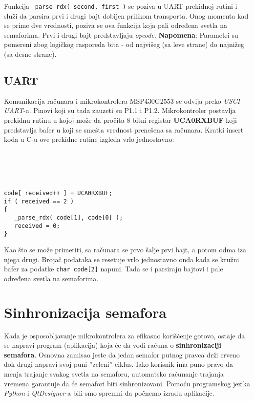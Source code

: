 \documentclass[a4paper,12pt, projekat]{etf}
\begin{document}
Funkcija \verb|_parse_rdx( second, first )| se poziva u UART prekidnoj rutini i služi da parsira prvi i drugi bajt dobijen prilikom transporta. Onog momenta kad se prime dve vrednosti, poziva se ova funkcija koja pali određena svetla na semaforima. Prvi i drugi bajt predstavljaju \textit{opcode}. \textbf{Napomena}: Parametri su pomereni zbog logičkog rasporeda bita - od najvišeg (sa leve strane) do najnižeg (sa desne strane).

\subsection{UART}
Komunikacija računara i mikrokontrolera MSP430G2553 se odvija preko \textit{USCI UART}-a. Pinovi koji su tada zauzeti su P1.1 i P1.2. Mikrokontroler postavlja prekidnu rutinu u kojoj može da pročita 8-bitni registar \textbf{UCA0RXBUF} koji predstavlja bafer u koji se smešta vrednost prenešena sa računara. Kratki insert koda u C-u ove prekidne rutine izgleda vrlo jednostavno:
\\
\\
\\
\\
\\

\begin{verbatim}
code[ received++ ] = UCA0RXBUF;
if ( received == 2 )
{
   _parse_rdx( code[1], code[0] );
   received = 0;
}
\end{verbatim}
Kao što se može primetiti, sa računara se prvo šalje prvi bajt, a potom odma iza njega drugi. Brojač podataka se resetuje vrlo jednostavno onda kada se kružni bafer za podatke \verb|char code[2]| napuni. Tada se i parsiraju bajtovi i pale određena svetla na semaforima.

\section{Sinhronizacija semafora}
Kada je osposobljavanje mikrokontrolera za efikasno korišćenje gotovo, ostaje da se napravi program (aplikacija) koja će da vodi računa o \textbf{sinhronizaciji semafora}. Osnovna zamisao jeste da jedan semafor putnog pravca drži crveno dok drugi napravi svoj puni ''zeleni'' ciklus. Iako korisnik ima puno pravo da menja trajanje svakog svetla na semaforu, automatsko računanje trajanja vremena garantuje da će semafori biti sinhronizovani. Pomoću programskog jezika \textit{Python} i \textit{QtDesigner}-a bili smo spremni da počnemo izradu aplikacije.
\end{document}
